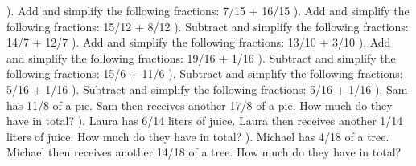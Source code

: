 \documentclass{article}%
\begin{document}
\newline%
\newline%
). Add and simplify the following fractions: 7/15 + 16/15%
\newline%
\newline%
). Add and simplify the following fractions: 15/12 + 8/12%
\newline%
\newline%
). Subtract and simplify the following fractions: 14/7 + 12/7%
\newline%
\newline%
). Add and simplify the following fractions: 13/10 + 3/10%
\newline%
\newline%
). Add and simplify the following fractions: 19/16 + 1/16%
\newline%
\newline%
). Subtract and simplify the following fractions: 15/6 + 11/6%
\newline%
\newline%
). Subtract and simplify the following fractions: 5/16 + 1/16%
\newline%
\newline%
). Subtract and simplify the following fractions: 5/16 + 1/16%
\newline%
\newline%
). Sam has 11/8 of a pie. Sam then receives another 17/8 of a pie. How much do they have in total?%
\newline%
\newline%
). Laura has 6/14 liters of juice. Laura then receives another 1/14 liters of juice. How much do they have in total?%
\newline%
\newline%
). Michael has 4/18 of a tree. Michael then receives another 14/18 of a tree. How much do they have in total?%
\newline%
\newline%
\newline%
\end{document}
